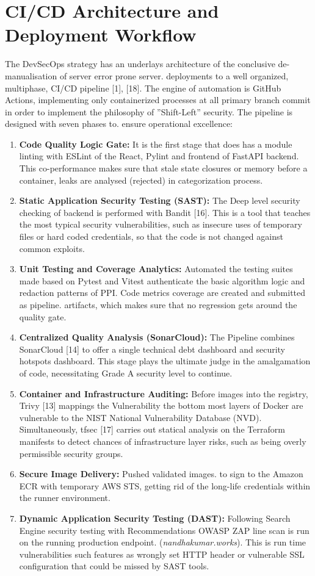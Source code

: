 \documentclass[conference]{IEEEtran}
\begin{document}
\section{CI/CD Architecture and Deployment Workflow}
The DevSecOps strategy has an underlays architecture of the conclusive de-manualisation of server error prone server. deployments to a well organized, multiphase, CI/CD pipeline [1], [18]. The engine of automation is GitHub Actions, implementing only containerized processes at all primary branch commit in order to implement the philosophy of ”Shift-Left” security. The pipeline is designed with seven phases to. ensure operational excellence: 
\begin{enumerate}
    \item \textbf{Code Quality Logic Gate:} It is the first stage that does has a module linting with ESLint of the React, Pylint and frontend of FastAPI backend. This co-performance makes sure that stale state closures or memory before a container, leaks are analysed (rejected) in categorization process.
    \item \textbf{Static Application Security Testing (SAST):} The Deep level security checking of backend is performed with Bandit [16]. This is a tool that teaches the most typical security vulnerabilities, such as insecure uses of temporary files or hard coded credentials, so that the code is not changed against common exploits.
    \item \textbf{Unit Testing and Coverage Analytics:} Automated the testing suites made based on Pytest and Vitest authenticate the basic algorithm logic and redaction patterns of PPI. Code metrics coverage are created and submitted as pipeline. artifacts, which makes sure that no regression gets around the quality gate.
    \item \textbf{Centralized Quality Analysis (SonarCloud):} The Pipeline combines SonarCloud [14] to offer a single technical debt dashboard and security hotspots dashboard. This stage plays the ultimate judge in the amalgamation of code, necessitating Grade A security level to continue.
    \item \textbf{Container and Infrastructure Auditing:} Before images into the registry, Trivy [13] mappings the Vulnerability the bottom most layers of Docker are vulnerable to the NIST National Vulnerability Database (NVD). Simultaneously, tfsec [17] carries out statical analysis on the Terraform manifests to detect chances of infrastructure layer risks, such as being overly permissible security groups.
    \item \textbf{Secure Image Delivery:} Pushed validated images. to sign to the Amazon ECR with temporary AWS STS, getting rid of the long-life credentials within the runner environment. 
    \item \textbf{Dynamic Application Security Testing (DAST):} Following Search Engine security testing with Recommendations OWASP ZAP line scan is run on the running production endpoint. (\textit{nandhakumar.works}). This is run time vulnerabilities such features as wrongly set HTTP header or vulnerable SSL configuration that could be missed by SAST tools. 
\end{enumerate}
\end{document}
